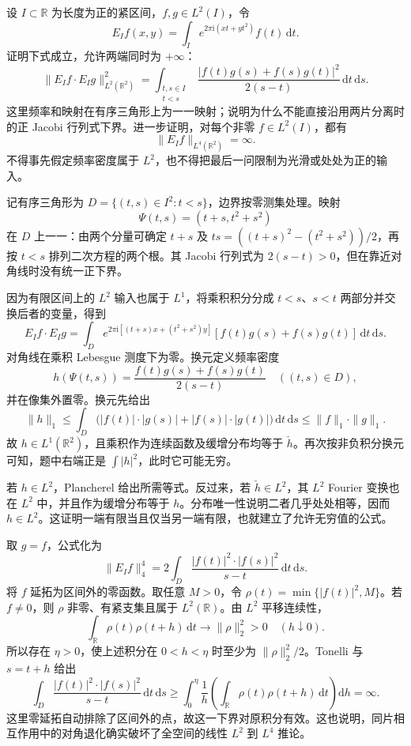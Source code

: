 \begin{optionalexercise}\label{b2:ex:25-new-5}
设 \(I\subset\mathbb R\) 为长度为正的紧区间，\(f,g\in L^2(I)\)，令
\[
 E_If(x,y)=\int_I e^{2\pi\mathrm i(xt+yt^2)}f(t)\,\mathrm dt.
\]
证明下式成立，允许两端同时为 \(+\infty\)：
\[
 \|E_If\cdot E_Ig\|_{L^2(\mathbb R^2)}^2
 =\int_{\substack{t,s\in I\\t<s}}
       \frac{|f(t)g(s)+f(s)g(t)|^2}{2(s-t)}\,\mathrm dt\,\mathrm ds.
\]
这里频率和映射在有序三角形上为一一映射；说明为什么不能直接沿用两片分离时的正 Jacobi 行列式下界。进一步证明，对每个非零 \(f\in L^2(I)\)，都有
\[
 \|E_If\|_{L^4(\mathbb R^2)}=\infty.
\]
不得事先假定频率密度属于 \(L^2\)，也不得把最后一问限制为光滑或处处为正的输入。
\end{optionalexercise}
\begin{solution}
记有序三角形为 \(D=\{(t,s)\in I^2:t<s\}\)，边界按零测集处理。映射
\[
 \Psi(t,s)=(t+s,t^2+s^2)
\]
在 \(D\) 上一一：由两个分量可确定 \(t+s\) 及
\(ts=((t+s)^2-(t^2+s^2))/2\)，再按 \(t<s\) 排列二次方程的两个根。其 Jacobi 行列式为 \(2(s-t)>0\)，但在靠近对角线时没有统一正下界。

因为有限区间上的 \(L^2\) 输入也属于 \(L^1\)，将乘积积分分成 \(t<s\)、\(s<t\) 两部分并交换后者的变量，得到
\[
 E_If\cdot E_Ig
 =\int_D e^{2\pi\mathrm i[(t+s)x+(t^2+s^2)y]}
       [f(t)g(s)+f(s)g(t)]\,\mathrm dt\,\mathrm ds.
\]
对角线在乘积 Lebesgue 测度下为零。换元定义频率密度
\[
 h(\Psi(t,s))
 =\frac{f(t)g(s)+f(s)g(t)}{2(s-t)}
 \quad((t,s)\in D),
\]
并在像集外置零。换元先给出
\[
 \|h\|_1
 \leq\int_D\bigl(|f(t)|\cdot|g(s)|+|f(s)|\cdot|g(t)|\bigr)
          \,\mathrm dt\,\mathrm ds
 \leq\|f\|_1\cdot\|g\|_1.
\]
故 \(h\in L^1(\mathbb R^2)\)，且乘积作为连续函数及缓增分布均等于 \(\check h\)。再次按非负积分换元可知，题中右端正是 \(\int|h|^2\)，此时它可能无穷。

若 \(h\in L^2\)，Plancherel 给出所需等式。反过来，若 \(\check h\in L^2\)，其 \(L^2\) Fourier 变换也在 \(L^2\) 中，并且作为缓增分布等于 \(h\)。分布唯一性说明二者几乎处处相等，因而 \(h\in L^2\)。这证明一端有限当且仅当另一端有限，也就建立了允许无穷值的公式。

取 \(g=f\)，公式化为
\[
 \|E_If\|_4^4
 =2\int_D\frac{|f(t)|^2\cdot|f(s)|^2}{s-t}\,\mathrm dt\,\mathrm ds.
\]
将 \(f\) 延拓为区间外的零函数。取任意 \(M>0\)，令
\(\rho(t)=\min\{|f(t)|^2,M\}\)。若 \(f\ne0\)，则 \(\rho\) 非零、有紧支集且属于 \(L^2(\mathbb R)\)。由 \(L^2\) 平移连续性，
\[
 \int_{\mathbb R}\rho(t)\rho(t+h)\,\mathrm dt
       \longrightarrow\|\rho\|_2^2>0
       \quad(h\downarrow0).
\]
所以存在 \(\eta>0\)，使上述积分在 \(0<h<\eta\) 时至少为
\(\|\rho\|_2^2/2\)。Tonelli 与 \(s=t+h\) 给出
\[
 \int_D\frac{|f(t)|^2\cdot|f(s)|^2}{s-t}\,\mathrm dt\,\mathrm ds
 \geq\int_0^\eta\frac1h
       \left(\int_{\mathbb R}\rho(t)\rho(t+h)\,\mathrm dt\right)\mathrm dh
 =\infty.
\]
这里零延拓自动排除了区间外的点，故这一下界对原积分有效。这也说明，同片相互作用中的对角退化确实破坏了全空间的线性 \(L^2\) 到 \(L^4\) 推论。
\end{solution}

